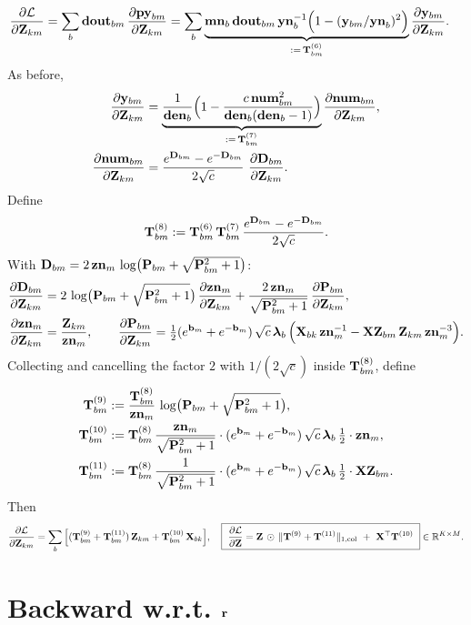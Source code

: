 \documentclass{article}
\begin{document}
\begin{align}
\ddfrac{\mathcal{L}}{\v{Z}{km}}
&= \sum_b \v{dout}{bm}\,\ddfrac{\v{py}{bm}}{\v{Z}{km}}
= \sum_b \underbrace{\v{mn}_b\,\v{dout}{bm}\,\v{yn}_b^{-1}\Big(1-(\v{y}{bm}/\v{yn}_b)^2\Big)}_{:=\,\T{6}{bm}}\ddfrac{\v{y}{bm}}{\v{Z}{km}}.
\end{align}
As before,
\begin{align}
\ddfrac{\v{y}{bm}}{\v{Z}{km}}
&= \underbrace{\frac{1}{\v{den}{b}}\Big(1-\frac{c\,\v{num}{bm}^2}{\v{den}{b}(\v{den}{b}-1)}\Big)}_{:=\,\T{7}{bm}}
\ddfrac{\v{num}{bm}}{\v{Z}{km}},\\
\ddfrac{\v{num}{bm}}{\v{Z}{km}}
&= \frac{\ev{D}{bm}-\ev{-D}{bm}}{2\sqrt{c}}\ \ddfrac{\v{D}{bm}}{\v{Z}{km}}.
\end{align}
Define
\[
\T{8}{bm}:=\T{6}{bm}\,\T{7}{bm}\,\frac{\ev{D}{bm}-\ev{-D}{bm}}{2\sqrt{c}}.
\]
With $\v{D}{bm}=2\,\v{zn}{m}\,\log\!\big(\v{P}{bm}+\sqrt{\v{P}{bm}^2+1}\big)$:
\begin{align}
\ddfrac{\v{D}{bm}}{\v{Z}{km}}
&= 2\,\log\!\big(\v{P}{bm}+\sqrt{\v{P}{bm}^2+1}\big)\,\ddfrac{\v{zn}{m}}{\v{Z}{km}}
+ \frac{2\,\v{zn}{m}}{\sqrt{\v{P}{bm}^2+1}}\,\ddfrac{\v{P}{bm}}{\v{Z}{km}},
\\
\ddfrac{\v{zn}{m}}{\v{Z}{km}} &= \frac{\v{Z}{km}}{\v{zn}{m}},\qquad
\ddfrac{\v{P}{bm}}{\v{Z}{km}}
= \tfrac12(\ev{b}{m}+\ev{-b}{m})\,\sqrt{c}\,\lam_b\,
\Big(\v{X}{bk}\,\v{zn}{m}^{-1} - \v{XZ}{bm}\,\v{Z}{km}\,\v{zn}{m}^{-3}\Big).
\end{align}
Collecting and cancelling the factor $2$ with $1/(2\sqrt{c})$ inside $\T{8}{bm}$, define
\begin{align}
\T{9}{bm} &:= \frac{\T{8}{bm}}{\v{zn}{m}}\,\log\!\big(\v{P}{bm}+\sqrt{\v{P}{bm}^2+1}\big),\\
\T{10}{bm} &:= \T{8}{bm}\,\frac{\v{zn}{m}}{\sqrt{\v{P}{bm}^2+1}}
\cdot (\ev{b}{m}+\ev{-b}{m})\,\sqrt{c}\,\lam_b\,\tfrac{1}{2}\cdot \v{zn}{m},\\
\T{11}{bm} &:= \T{8}{bm}\,\frac{1}{\sqrt{\v{P}{bm}^2+1}}
\cdot (\ev{b}{m}+\ev{-b}{m})\,\sqrt{c}\,\lam_b\,\tfrac{1}{2}\cdot \v{XZ}{bm}.
\end{align}
Then
\[
\ddfrac{\mathcal{L}}{\v{Z}{km}}
= \sum_b \Big[(\T{9}{bm}+\T{11}{bm})\,\v{Z}{km} + \T{10}{bm}\,\v{X}{bk}\Big],
\quad
\boxed{\ \ddfrac{\mathcal{L}}{\v{Z}} = \v{Z}\,\had\,\colnorm{\T{9}+\T{11}}\ +\ \v{X}^\top \T{10}\ }\in\mathbb{R}^{K\times M}.
\]

\section{Backward w.r.t. $\v{r}$}
\end{document}

